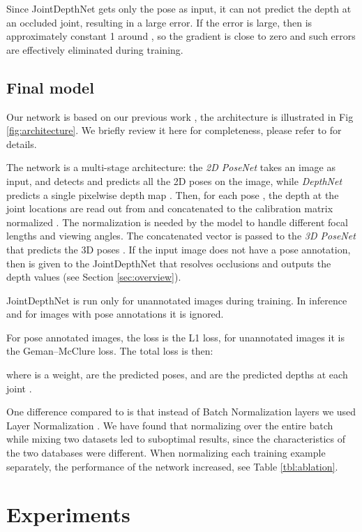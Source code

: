 \documentclass[runningheads]{llncs}
\begin{document}
Since JointDepthNet gets only the pose as input, it can not predict the depth at an occluded joint, resulting in a large error. If the error  is large, then  is approximately constant 1 around , so the gradient is close to zero and such errors are effectively eliminated during training.

\subsection{Final model}\label{sec:full-model}

Our network is based on our previous work \cite{veges2019depthpose}, the architecture is illustrated in Fig \ref{fig:architecture}. We briefly review it here for completeness, please refer to \cite{veges2019depthpose} for details.

The network is a multi-stage architecture: the \emph{2D PoseNet} takes an image as input, and detects and predicts all the  2D poses on the image, while \emph{DepthNet} predicts a single pixelwise depth map . Then, for each pose , the depth at the joint locations are read out from  and concatenated to the calibration matrix normalized . The normalization is needed by the model to handle different focal lengths and viewing angles. The concatenated vector is passed to the \emph{3D PoseNet} that predicts the 3D poses . If the input image does not have a pose annotation, then  is given to the JointDepthNet that resolves occlusions and outputs the  depth values (see Section \ref{sec:overview}). 

JointDepthNet is run only for unannotated images during training. In inference and for images with pose annotations it is ignored.

For pose annotated images, the loss is the L1 loss, for unannotated images it is the Geman--McClure loss. The total loss is then:

where  is a weight,  are the predicted poses, and  are the predicted depths at each joint .

One difference compared to \cite{veges2019depthpose} is that instead of Batch Normalization layers \cite{batchnorm} we used Layer Normalization \cite{ba2016layer}. We have found that normalizing over the entire batch while mixing two datasets led to suboptimal results, since the characteristics of the two databases were different. When normalizing each training example separately, the performance of the network increased, see Table \ref{tbl:ablation}.

\section{Experiments}
\end{document}
